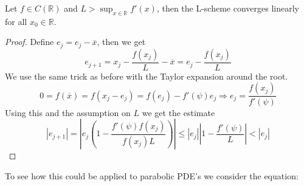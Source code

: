 \documentclass[../Main/main.tex]{subfiles}
\begin{document}
	\begin{theorem}
		Let $f\in C(\mathbb{R})$ and $L>\sup_{x\in\mathbb{R}}f'(x)$, then the L-scheme converges linearly for all $x_0\in \mathbb{R}$.
	\end{theorem}
	\begin{proof}
		Define $e_j = e_j-\overline{x}$, then we get
		\begin{equation}
			e_{j+1} = x_j-\frac{f(x_j)}{L}-\overline{x}=e_j-\frac{f(x_j)}{L}
		\end{equation}
		We use the same trick as before with the Taylor expansion around the root.
		\begin{equation}
			0 = f(\overline{x}) = f(x_j-e_j) = f(e_j)-f'(\psi)e_j\Rightarrow e_j = \frac{f(x_j)}{f'(\psi)}
		\end{equation}
		Using this and the assumption on $L$ we get the estimate
		\begin{equation}
			|e_{j+1}|=|e_j(1-\frac{f'(\psi)f(x_j)}{f(x_j)L})|\leq|e_j||1-\frac{f'(\psi)}{L}|<|e_j|
		\end{equation}
	\end{proof}
	To see how this could be applied to parabolic PDE's we consider the equation:
	
\end{document}
